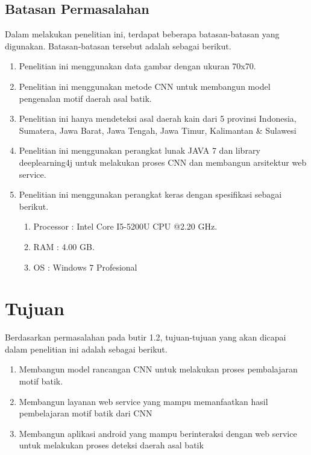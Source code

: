 \subsection{Batasan Permasalahan}
Dalam melakukan penelitian ini, terdapat beberapa batasan-batasan yang digunakan. Batasan-batasan tersebut adalah sebagai berikut.
\begin{enumerate}
	\item Penelitian ini menggunakan data gambar dengan ukuran 70x70.
	\item Penelitian ini menggunakan metode CNN untuk membangun model pengenalan motif daerah asal batik.
	\item Penelitian ini hanya mendeteksi asal daerah kain dari 5 provinsi Indonesia, Sumatera, Jawa Barat, Jawa Tengah, Jawa Timur, Kalimantan \& Sulawesi
	\item Penelitian ini menggunakan perangkat lunak JAVA 7 dan library deeplearning4j untuk melakukan proses CNN dan membangun arsitektur web service.
	\item Penelitian ini menggunakan perangkat keras dengan spesifikasi sebagai berikut.
	\begin{enumerate}
		\item Processor : Intel Core I5-5200U CPU @2.20 GHz.
		\item RAM : 4.00 GB.
		\item OS : Windows 7 Profesional
	\end{enumerate}
\end{enumerate}

\section{Tujuan}
Berdasarkan permasalahan pada butir 1.2, tujuan-tujuan yang akan dicapai dalam penelitian ini adalah sebagai berikut.
\begin{enumerate}
	\item Membangun model rancangan CNN untuk melakukan proses pembalajaran motif batik.
	\item Membangun layanan web service yang mampu memanfaatkan hasil pembelajaran motif batik dari CNN
	\item Membangun aplikasi android yang mampu berinteraksi dengan web service untuk melakukan proses deteksi daerah asal batik
\end{enumerate}

